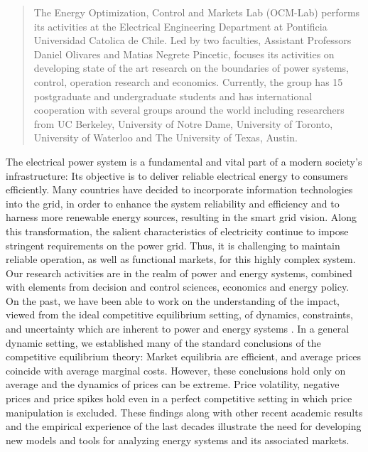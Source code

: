 
\setcounter{section}{0}
\setcounter{figure}{0}
\graphicspath{{./figs/}}


\begin{abstract}

The Energy Optimization, Control and Markets Lab (OCM-Lab) performs its activities at the Electrical Engineering Department at Pontificia Universidad Catolica de Chile. Led by two faculties, Assistant Professors Daniel Olivares and Matias Negrete Pincetic, focuses its activities on developing state of the art research on the boundaries of power systems, control, operation research and economics. Currently, the group has 15 postgraduate and undergraduate students and has international cooperation with several groups around the world including researchers from UC Berkeley, University of Notre Dame, University of Toronto, University of Waterloo and The University of Texas, Austin.
\end{abstract}


The electrical power system is a fundamental and vital part of a modern society's infrastructure: Its objective is to deliver reliable electrical energy to consumers efficiently. Many countries have decided to incorporate information technologies into the grid, in order to enhance the system reliability and efficiency and to harness more renewable energy sources, resulting in the smart grid vision. Along this transformation, the salient characteristics of electricity continue to impose stringent requirements on the power grid. Thus, it is challenging to maintain reliable operation, as well as functional markets, for this highly complex system. \\

Our research activities are in the realm of power and energy systems, combined with elements from decision and control sciences, economics and energy policy. On the past, we have been able to work on the understanding of the impact, viewed from the ideal competitive equilibrium setting, of dynamics, constraints, and uncertainty which are inherent to power and energy systems \cite{wannegkowshameysha11b}. In a general dynamic setting, we established many of the standard conclusions of the competitive equilibrium theory: Market equilibria are efficient, and average prices coincide with average marginal costs. However, these conclusions hold only on average and the dynamics of prices can be extreme. Price volatility, negative prices and price spikes hold even in a perfect competitive setting in which price manipulation is excluded. These findings along with other recent academic results and the empirical experience of the last decades illustrate the need for developing new models and tools for analyzing energy systems and its associated markets.\\

